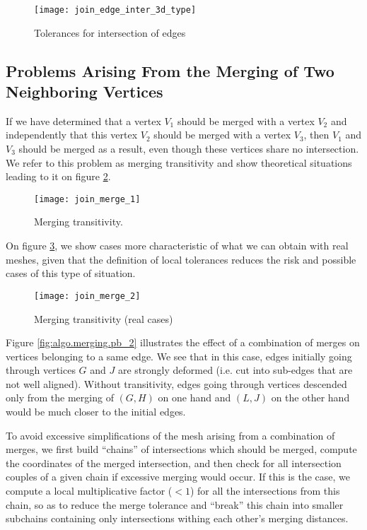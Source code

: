 \begin{figure}[!h]
\centerline{
\texttt{[image: join\_edge\_inter\_3d\_type]}}
\caption{Tolerances for intersection of edges}
\label{fig:algo.join.edgeint_type}
\end{figure}

\subsection*{Problems Arising From the Merging of Two Neighboring Vertices
                \label{sec:join.pb_merge}}

If we have determined that a vertex $V_1$ should be merged with a
vertex $V_2$ and independently that this vertex $V_2$ should be
merged with a vertex $V_3$, then $V_1$ and $V_3$ should be
merged as a result, even though these vertices share no intersection.
We refer to this problem as merging transitivity and show
theoretical situations leading to it on figure \ref{fig:algo.merging.pb}.

\begin{figure}[!h]
\centerline{
\texttt{[image: join\_merge\_1]}}
\caption{Merging transitivity.}
\label{fig:algo.merging.pb}
\end{figure}

On figure \ref{fig:algo.merging.pb_1}, we show cases more
characteristic of what we can obtain with real meshes, given
that the definition of local tolerances reduces the risk and
possible cases of this type of situation.

\begin{figure}[!h]
\centerline{
\texttt{[image: join\_merge\_2]}}
\caption{Merging transitivity (real cases)}
\label{fig:algo.merging.pb_1}
\end{figure}

Figure \ref{fig:algo.merging.pb_2} illustrates the effect of
a combination of merges on vertices belonging to a same edge.
We see that in this case, edges initially going through
vertices $G$ and $J$ are strongly deformed (i.e. cut into
sub-edges that are not well aligned). Without transitivity,
edges going through vertices descended only from the merging
of $(G, H)$ on one hand and $(L, J)$ on the other hand
would be much closer to the initial edges.

To avoid excessive simplifications of the mesh arising from a
combination of merges, we first build ``chains'' of intersections
which should be merged, compute the coordinates of the merged
intersection, and then check for all intersection couples
of a given chain if excessive merging would occur. If this is the case,
we compute a local multiplicative factor ($< 1$) for all the
intersections from this chain, so as to reduce the merge tolerance
and ``break'' this chain into smaller subchains containing only
intersections withing each other's merging distances.

